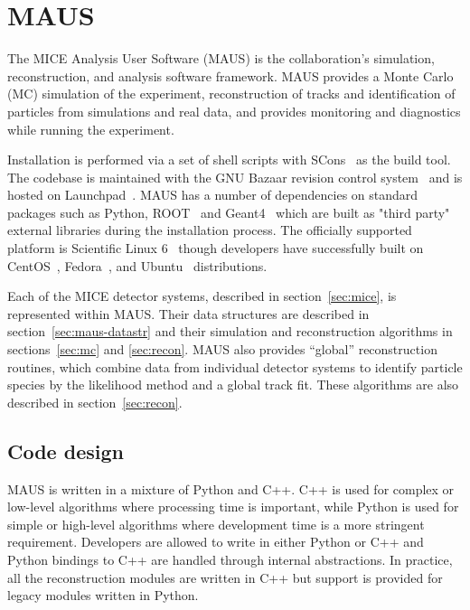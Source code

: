 \documentclass[11pt]{article}
\begin{document}

\section{MAUS}\label{sec:maus}

The MICE  Analysis User Software (MAUS) is the collaboration's simulation, reconstruction, and  analysis software framework. MAUS provides a Monte Carlo (MC) simulation of the experiment, reconstruction of tracks and identification of particles from simulations and real data, and provides monitoring and diagnostics while running the experiment.

Installation is performed via a set of shell scripts with SCons~\cite{SCONS} as the build tool. The codebase is maintained with  the GNU Bazaar revision control system~\cite{bazaar} and is hosted on Launchpad~\cite{launchpad}. MAUS has a number of dependencies on standard packages such as Python, ROOT~\cite{ROOT} and Geant4~\cite{GEANT4} which are built as "third party" external libraries during the installation process.  The officially supported platform is Scientific Linux 6~\cite{scilinux} though developers have successfully built on CentOS~\cite{centos}, Fedora~\cite{fedora}, and Ubuntu~\cite{ubuntu} distributions.

Each of the MICE detector systems, described in section~\ref{sec:mice}, is represented within MAUS. Their data structures are described in section~\ref{sec:maus-datastr} and their simulation and reconstruction algorithms in sections~\ref{sec:mc} and \ref{sec:recon}. MAUS also provides ``global'' reconstruction routines, which combine data from individual detector systems to identify particle species by the likelihood method and a global track fit. These algorithms are also described in section~\ref{sec:recon}. 


\subsection{Code design}\label{sec:maus-arch}

MAUS is written in a mixture of Python and C++. C++ is used for complex or low-level algorithms where processing time is important, while Python is used for simple or high-level algorithms where development time is a more stringent requirement. Developers are allowed to write in either Python or C++ and Python bindings to C++ are handled through internal abstractions. In practice, all the reconstruction modules are written in C++ but support is provided for legacy modules written in Python.
\end{document}
